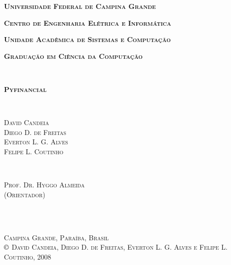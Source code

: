 \pagestyle{empty}

\begin{center}
{\textbf{\Large \textsc{Universidade Federal de Campina Grande}}}
\end{center}

\begin{center}
\textbf{{\Large \textsc{Centro de Engenharia Elétrica e
Informática}}}
\end{center}

\begin{center}
\textbf{{\Large \textsc{Unidade Acadêmica de Sistemas e
Computação}}}
\end{center}

\begin{center}
{\large \textsc{\textbf{Graduação em Ciência da Computação}}}
\end{center}


~\\


\begin{center}
{\Large \textsc{\textbf{Pyfinancial}}}
\end{center}
~\\

\begin{center}
\large{\textsc{David Candeia}\\ \textsc{Diego D. de Freitas}\\ \textsc{Everton L. G. Alves}\\
\textsc{Felipe L. Coutinho}}
\end{center}

% 
~\\

\begin{center}
\textsc{Prof. Dr. Hyggo Almeida}\\
\textsc{(Orientador)}\\
\end{center}

~\\
~\\

\begin{center}
{\small \textsc{Campina Grande, Paraíba, Brasil}}\\
{\small \textsc{$\copyright$ David Candeia, Diego D. de Freitas, Everton L. G. Alves e Felipe L. Coutinho, 2008}}
\end{center}

\cleardoublepage
